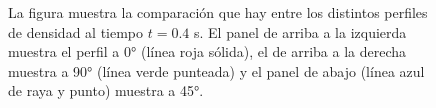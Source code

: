 \documentclass[12pt,a4paper]{book}
\begin{document}
\begin{figure}
  \centering
    \caption{La figura muestra la comparación que hay entre los distintos perfiles de
    densidad al tiempo $t = 0.4$ s. El panel de arriba a la izquierda muestra el perfil a 0° (línea roja
    sólida), el de arriba a la derecha muestra a 90° (línea verde punteada) y el panel de abajo 
    (línea azul de raya y punto) muestra a 45°.}
    \label{fig:comparacion_perfil_radial}
\end{figure}
\end{document}
